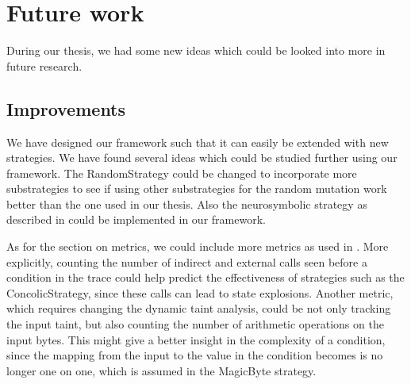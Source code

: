 
\chapter{Future work}\label{chap:future} %
During our thesis, we had some new ideas which could be looked into more in future research.




% 


\section{Improvements}



We have designed our framework such that it can easily be extended with new strategies. We have found several ideas which could be studied further using our framework. The RandomStrategy could be changed to incorporate more substrategies to see if using other substrategies for the random mutation work better than the one used in our thesis. Also the neurosymbolic strategy as described in \cite{shen2019neuro} could be implemented in our framework. 

As for the section on metrics, we could include more metrics as used in \cite{chen2020meuzz}. More explicitly, counting the number of indirect and external calls seen before a condition in the trace could help predict the effectiveness of strategies such as the ConcolicStrategy, since these calls can lead to state explosions. Another metric, which requires changing the dynamic taint analysis, could be not only tracking the input taint, but also counting the number of arithmetic operations on the input bytes. This might give a better insight in the complexity of a condition, since the mapping from the input to the value in the condition becomes is no longer one on one, which is assumed in the MagicByte strategy.

